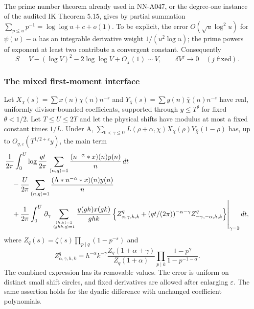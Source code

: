 The prime number theorem already used in NN-A047, or the degree-one
instance of the audited IK Theorem 5.15, gives by partial summation
$\sum_{p\le u}p^{-1}=\log\log u+c+o(1)$. To be explicit, the
error $O(\sqrt u\log^2u)$ for $\psi(u)-u$ has an integrable
derivative weight $1/(u^2\log u)$; the prime powers of exponent
at least two contribute a convergent constant. Consequently
\[
 S=V-(\log V)^2-2\log\log V+O_\chi(1)\sim V,
 \qquad \delta V^j\longrightarrow0\quad(j\text{ fixed}).
\tag{A049g.5}
\]

\subsubsection*{The mixed first-moment interface}

\begin{lemma}
\label{lem:A049-two-shift-first}
Let $X_\chi(s)=\sum x(n)\chi(n)n^{-s}$ and
$Y_{\bar\chi}(s)=\sum y(n)\bar\chi(n)n^{-s}$ have real,
uniformly divisor-bounded coefficients, supported through
$y\le T^\theta$ for fixed $\theta<1/2$. Let $T\le U\le2T$
and let the physical shifts have modulus at most a fixed
constant times $1/L$. Under A,
$\sum_{0<\gamma\le U}L(\rho+\alpha,\chi)
X_\chi(\rho)Y_{\bar\chi}(1-\rho)$ has, up to
$O_{q,\varepsilon}(T^{1/2+\varepsilon}y)$, the main term
\begin{align*}
 &\frac1{2\pi}\int_0^U\log\frac{qt}{2\pi}\,
       \sum_{(n,q)=1}\frac{(n^{-\alpha}*x)(n)y(n)}n\,dt\\
 &\quad-\frac U{2\pi}
       \sum_{(n,q)=1}\frac{(\Lambda*n^{-\alpha}*x)(n)y(n)}n\\
 &\quad+\frac1{2\pi}\int_0^U\left.\partial_\gamma
       \sum_{(h,k)=1\atop(ghk,q)=1}\frac{y(gh)x(gk)}{ghk}
       \left\{Z^q_{\alpha,\gamma,h,k}
       +(qt/(2\pi))^{-\alpha-\gamma}
                           Z^q_{-\gamma,-\alpha,h,k}\right\}
                                                    \right|_{\gamma=0}dt,
\end{align*}
where $Z_q(s)=\zeta(s)\prod_{p\mid q}(1-p^{-s})$ and
\[
 Z^q_{\alpha,\gamma,h,k}
 =h^{-\alpha}k^{-\gamma}
       \frac{Z_q(1+\alpha+\gamma)}{Z_q(1+\alpha)}
       \prod_{p\mid k}\frac{1-p^\gamma}{1-p^{-1-\alpha}}.
\tag{A049g.6}
\]
The combined expression has its removable values. The error is
uniform on distinct small shift circles, and fixed derivatives are
allowed after enlarging $\varepsilon$. The same assertion holds for
the dyadic difference with unchanged coefficient polynomials.
\end{lemma}

